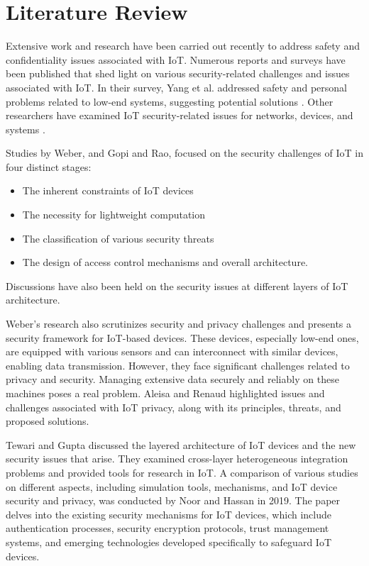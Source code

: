 
\section{Literature Review}
\label{sec:Literature Review}

Extensive work and research have been carried out recently to address safety and confidentiality issues associated with \gls{IoT}. Numerous reports and surveys have been published that shed light on various security-related challenges and issues associated with IoT. In their survey, Yang et al. addressed safety and personal problems related to low-end systems, suggesting potential solutions \cite{lin2017survey}. Other researchers have examined IoT security-related issues for networks, devices, and systems \cite{Hukkeri}.

Studies by Weber, and Gopi and Rao, focused on the security challenges of IoT in four distinct stages:
\begin{itemize}
\item The inherent constraints of IoT devices
\item The necessity for lightweight computation
\item The classification of various security threats
\item The design of access control mechanisms and overall architecture\cite{weber2015internet}\cite{gopi2018survey}.
\end{itemize}
Discussions have also been held on the security issues at different layers of IoT architecture.


Weber's research also scrutinizes security and privacy challenges and presents a security framework for IoT-based devices\cite{weber2015internet}. These devices, especially low-end ones, are equipped with various sensors and can interconnect with similar devices, enabling data transmission. However, they face significant challenges related to privacy and security. Managing extensive data securely and reliably on these machines poses a real problem. Aleisa and Renaud highlighted issues and challenges associated with IoT privacy, along with its principles, threats, and proposed solutions\cite{aleisa2016privacy}.

Tewari and Gupta discussed the layered architecture of IoT devices and the new security issues that arise\cite{tewari2020security}. They examined cross-layer heterogeneous integration problems and provided tools for research in IoT. A comparison of various studies on different aspects, including simulation tools, mechanisms, and IoT device security and privacy, was conducted by Noor and Hassan in 2019. The paper delves into the existing security mechanisms for IoT devices, which include authentication processes, security encryption protocols, trust management systems, and emerging technologies developed specifically to safeguard IoT devices\cite{hassan2019current}.

